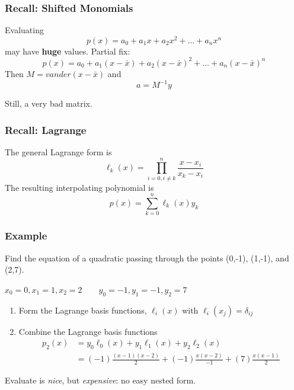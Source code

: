 \documentclass[10pt]{beamer}
\begin{document}
\begin{frame}
\frametitle{Recall: Shifted Monomials}
  Evaluating
  \begin{equation*}
    p(x) = a_0 + a_1 x + a_2 x^2 +\dots + a_{n} x^{n}
  \end{equation*}
  may have {\bf{huge}} values.  Partial fix:
  \begin{equation*}
    p(x) = a_0 + a_1 (x-\bar{x}) + a_2 (x-\bar{x})^2 +\dots + a_{n} (x-\bar{x})^{n}
  \end{equation*}
  Then $M = vander(x-\bar{x})$ and
  \begin{equation*}
    a = M^{-1} y
  \end{equation*}
  
  Still, a very bad matrix.

\end{frame}
\begin{frame}
\frametitle{Recall: Lagrange}
The general Lagrange form is
\begin{equation*}
  \ell_k(x) = \prod_{i=0,i\ne k}^{n} \frac{x-x_i}{x_k - x_i}
\end{equation*}
The resulting interpolating polynomial is
\begin{equation*}
  p(x) = \sum_{k=0}^n \ell_k(x) y_k
\end{equation*}
\end{frame}
\begin{frame}
\frametitle{Example}
Find the equation of a quadratic passing through the points
(0,-1), (1,-1), and (2,7).

\begin{block}{}
$ x_0 = 0, x_1 = 1, x_2 = 2 \qquad y_0 = -1, y_1 = -1, y_2 = 7 $
\end{block}
\begin{enumerate}
\item Form the Lagrange basis functions, $\ell_i(x)$ with
$\ell_i(x_j)=\delta_{ij}$
\item Combine the Lagrange basis functions
\begin{align*} 
p_2(x)  & =  y_0 \ell_0(x) + y_1 \ell_1(x) + y_2 \ell_2(x) \\ 
        & =  (-1) \frac{(x-1)(x-2)}{2} + (-1)\frac{x(x-2)}{-1} +
(7)\frac{x(x-1)}{2}
\end{align*}
\end{enumerate}

Evaluate is \emph{nice}, but \emph{expensive}: no easy nested form.
\end{frame}
\end{document}
